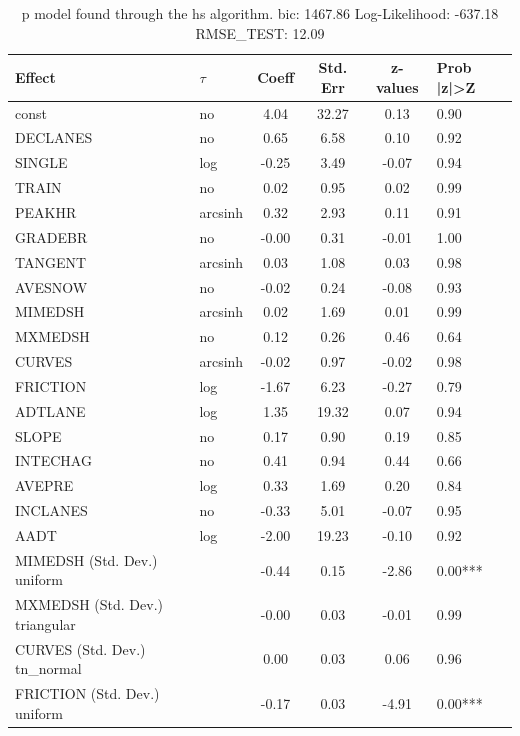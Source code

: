 \begin{table}
	\caption{p model found through the hs algorithm. bic: 1467.86 Log-Likelihood: -637.18 RMSE_TEST: 12.09}
	\begin{center}
		\begin{tabular}{|l|l|c|c|c|l|}
			\hline
			Effect & $\tau$ & Coeff & Std. Err & z-values & Prob |z|>Z \\
			\hline
			const & no & 4.04 & 32.27 & 0.13 & 0.90 \\
			\hline
			DECLANES & no & 0.65 & 6.58 & 0.10 & 0.92 \\
			\hline
			SINGLE & log & -0.25 & 3.49 & -0.07 & 0.94 \\
			\hline
			TRAIN & no & 0.02 & 0.95 & 0.02 & 0.99 \\
			\hline
			PEAKHR & arcsinh & 0.32 & 2.93 & 0.11 & 0.91 \\
			\hline
			GRADEBR & no & -0.00 & 0.31 & -0.01 & 1.00 \\
			\hline
			TANGENT & arcsinh & 0.03 & 1.08 & 0.03 & 0.98 \\
			\hline
			AVESNOW & no & -0.02 & 0.24 & -0.08 & 0.93 \\
			\hline
			MIMEDSH & arcsinh & 0.02 & 1.69 & 0.01 & 0.99 \\
			\hline
			MXMEDSH & no & 0.12 & 0.26 & 0.46 & 0.64 \\
			\hline
			CURVES & arcsinh & -0.02 & 0.97 & -0.02 & 0.98 \\
			\hline
			FRICTION & log & -1.67 & 6.23 & -0.27 & 0.79 \\
			\hline
			ADTLANE & log & 1.35 & 19.32 & 0.07 & 0.94 \\
			\hline
			SLOPE & no & 0.17 & 0.90 & 0.19 & 0.85 \\
			\hline
			INTECHAG & no & 0.41 & 0.94 & 0.44 & 0.66 \\
			\hline
			AVEPRE & log & 0.33 & 1.69 & 0.20 & 0.84 \\
			\hline
			INCLANES & no & -0.33 & 5.01 & -0.07 & 0.95 \\
			\hline
			AADT & log & -2.00 & 19.23 & -0.10 & 0.92 \\
			\hline
			MIMEDSH (Std. Dev.) uniform &  & -0.44 & 0.15 & -2.86 & 0.00*** \\
			\hline
			MXMEDSH (Std. Dev.) triangular &  & -0.00 & 0.03 & -0.01 & 0.99 \\
			\hline
			CURVES (Std. Dev.) tn_normal &  & 0.00 & 0.03 & 0.06 & 0.96 \\
			\hline
			FRICTION (Std. Dev.) uniform &  & -0.17 & 0.03 & -4.91 & 0.00*** \\

\end{tabular}
\end{center}
\end{table}
